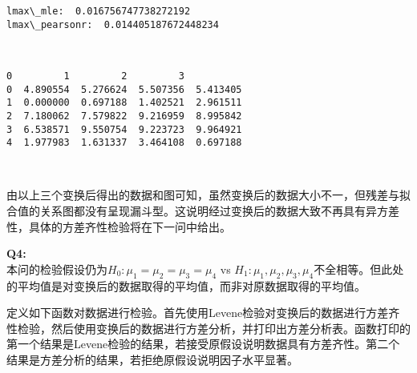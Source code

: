 \documentclass[11pt]{ctexart}
\begin{document}
    \begin{Verbatim}[commandchars=\\\{\}]
lmax\_mle:  0.016756747738272192
lmax\_pearsonr:  0.014405187672448234
    \end{Verbatim}

    \begin{center}
    \end{center}
    { \hspace*{\fill} \\}
    
    \begin{Verbatim}[commandchars=\\\{\}]
          0         1         2         3
0  4.890554  5.276624  5.507356  5.413405
1  0.000000  0.697188  1.402521  2.961511
2  7.180062  7.579822  9.216959  8.995842
3  6.538571  9.550754  9.223723  9.964921
4  1.977983  1.631337  3.464108  0.697188
    \end{Verbatim}

    \begin{center}
    \end{center}
    { \hspace*{\fill} \\}
    
    由以上三个变换后得出的数据和图可知，虽然变换后的数据大小不一，但残差与拟合值的关系图都没有呈现漏斗型。这说明经过变换后的数据大致不再具有异方差性，具体的方差齐性检验将在下一问中给出。

    \textbf{Q4:}\\
本问的检验假设仍为\(H_0: \mu_1 = \mu_2 = \mu_3 = \mu_4\) vs
\(H_1: \mu_1, \mu_2, \mu_3, \mu_4\)不全相等。但此处的平均值是对变换后的数据取得的平均值，而非对原数据取得的平均值。

定义如下函数对数据进行检验。首先使用Levene检验对变换后的数据进行方差齐性检验，然后使用变换后的数据进行方差分析，并打印出方差分析表。函数打印的第一个结果是Levene检验的结果，若接受原假设说明数据具有方差齐性。第二个结果是方差分析的结果，若拒绝原假设说明因子水平显著。
\end{document}
